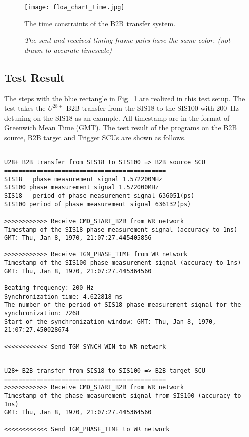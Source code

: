 \begin{landscape}
\begin{figure}[!htb]
   \centering   
   \texttt{[image: flow\_chart\_time.jpg]}
   \caption{The time constraints of the B2B transfer system.}
   \caption*{\textsl{\small{The sent and received timing frame pairs have the same color. (not drawn to accurate timescale) }}}
   \label{time_constraint}
\end{figure}
\end{landscape}

\subsection{Test Result}
The steps with the blue rectangle in Fig.~\ref{time_constraint} are realized in this test setup. The test takes the $U^{28+}$ B2B transfer from the SIS18 to the SIS100 with \SI{200}{Hz} detuning on the SIS18 as an example. All timestamp are in the format of Greenwich Mean Time (GMT).  The test result of the programs on the B2B source, B2B target and Trigger SCUs are shown as follows. 

\begin{lstlisting}[language={[ANSI]C}, keywordstyle=\color{blue!70}, commentstyle=\color{red!50!green!50!blue!50}, frame=shadowbox, rulesepcolor=\color{red!20!green!20!blue!20}]

U28+ B2B transfer from SIS18 to SIS100 => B2B source SCU
=============================================
SIS18 	phase measurement signal 1.572200MHz
SIS100 phase measurement signal 1.572000MHz 
SIS18 	period of phase measurement signal 636051(ps)
SIS100 period of phase measurement signal 636132(ps)

>>>>>>>>>>>> Receive CMD_START_B2B from WR network
Timestamp of the SIS18 phase measurement signal (accuracy to 1ns)
GMT: Thu, Jan 8, 1970, 21:07:27.445405856

>>>>>>>>>>>> Receive TGM_PHASE_TIME from WR network
Timestamp of the SIS100 phase measurement signal (accuracy to 1ns)
GMT: Thu, Jan 8, 1970, 21:07:27.445364560

Beating frequency: 200 Hz 
Synchronization time: 4.622818 ms
The number of the period of SIS18 phase measurement signal for the synchronization: 7268
Start of the synchronization window: GMT: Thu, Jan 8, 1970, 21:07:27.450028674

<<<<<<<<<<<< Send TGM_SYNCH_WIN to WR network
\end{lstlisting}

\begin{lstlisting}[language={[ANSI]C}, keywordstyle=\color{blue!70}, commentstyle=\color{red!50!green!50!blue!50}, frame=shadowbox, rulesepcolor=\color{red!20!green!20!blue!20}]

U28+ B2B transfer from SIS18 to SIS100 => B2B target SCU
=============================================
>>>>>>>>>>>> Receive CMD_START_B2B from WR network
Timestamp of the phase measurement signal from SIS100 (accuracy to 1ns)
GMT: Thu, Jan 8, 1970, 21:07:27.445364560

<<<<<<<<<<<< Send TGM_PHASE_TIME to WR network
\end{lstlisting}

